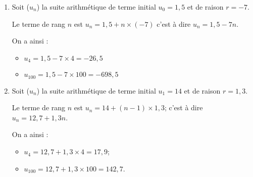 \begin{myexs}
	\begin{enumerate}
		\item 	Soit ($u_n$) la suite arithmétique de terme initial $u_0 = 1,5$ et de raison $r = -7$.
		
		Le terme de rang $n$ est $u_n = 1,5 + n \times (-7)$ c'est à dire $u_n=1,5 - 7n$.
		
		On a ainsi : 
		\begin{itemize}
			\item $u_4 = 1,5 - 7 \times 4 = -26,5$
			\item $u_{100} = 1,5 - 7 \times 100 = -698,5$
		\end{itemize}
		
		\item Soit ($u_n$) la suite arithmétique de terme initial $u_1 = 14$ et de raison $r = 1,3$.
		
		Le terme de rang $n$ est $u_n = 14 + (n-1) \times 1,3$; c'est à dire $u_n = 12,7 + 1,3n$.

		On a ainsi : 
		\begin{itemize}
			\item $u_4 = 12,7 + 1,3 \times 4 = 17,9$;
			\item $u_{100} = 12,7 + 1,3 \times 100 = 142,7$.
		\end{itemize}
	\end{enumerate}

	
	
\end{myexs}